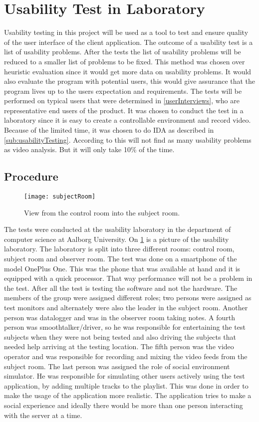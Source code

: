 \section{Usability Test in Laboratory}
Usability testing in this project will be used as a tool to test and
ensure quality of the user interface of the client application. The outcome of a usability
test is a list of usability problems. After the tests the list of usability problems will be reduced to a smaller list of problems to be fixed. This method was chosen over heuristic evaluation since it would get more data on usability problems. It would also evaluate the program with potential users, this would give assurance that the program lives up to the users expectation and requirements. The tests will be performed on
typical users that were determined in \cref{userInterviews}, who are
representative end users of the product. It was chosen to conduct the
test in a laboratory since it is easy to create a controllable
environment and record video. Because of the limited time, it was
chosen to do IDA as described in \cref{sub:usabilityTesting}. According to \cite{kjeldskov2004instant} this will not find as many usability problems as video analysis. But it will only take 10\% of the time.

\subsection{Procedure}
\begin{figure}
  \centering
  \texttt{[image: subjectRoom]}
  \caption{View from the control room into the subject room.}
  \label{fig:subjectRoom}
\end{figure}

The tests were conducted at the usability laboratory in the department of computer science at Aalborg University. On \cref{fig:subjectRoom} is a picture of the usability laboratory. The laboratory is split into three different rooms: control room, subject room and observer room. The test was done on a smartphone of the model OnePlus One. This was
the phone that was available at hand and it is equipped with a quick
processor. That way performance will not be a problem in the
test. After all the test is testing the software and not the
hardware. The members of the group were assigned different roles; two
persons were assigned as test monitors and alternately were also the
leader in the subject room. Another person was datalogger and was in
the observer room taking notes. A fourth person was
smoothtalker/driver, so he was responsible for entertaining the test
subjects when they were not being tested and also driving the subjects
that needed help arriving at the testing location. The fifth person
was the video operator and was responsible for recording and mixing
the video feeds from the subject room. The last person was assigned the role of social environment simulator. He was responsible for simulating other users actively using the test application, by adding multiple tracks to the playlist. This was done in order to make the usage of the application more realistic. The application tries to make a social experience and ideally there would be more than one person interacting with the server at a time.

